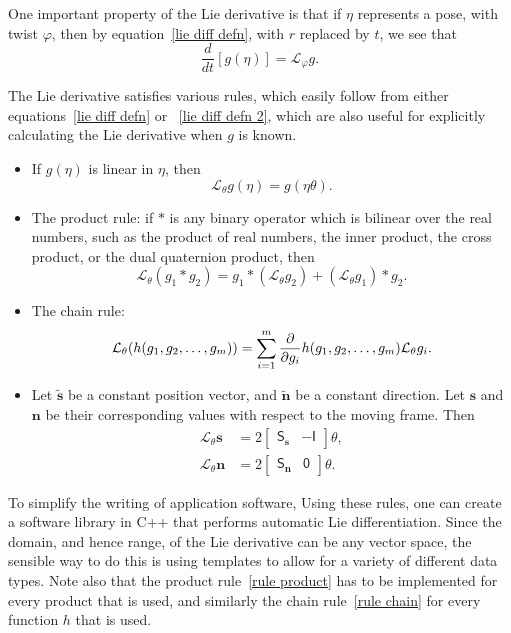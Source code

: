 \documentclass[reqno,12pt]{amsart}
\newcommand\starop[1]{\mathsf S_{#1}}
\newcommand{\liederiv}{\mathcal L}
\begin{document}
One important property of the Lie derivative is that if $\eta$ represents a pose, with twist $\varphi$, then by equation~\eqref{lie diff defn}, with $r$ replaced by $t$, we see that
\begin{equation}
\label{dot f Lie phi}
\frac d{dt} [g(\eta)] = \liederiv_\varphi g .
\end{equation}

The Lie derivative satisfies various rules, which easily follow from either equations~\eqref{lie diff defn} or ~\eqref{lie diff defn 2}, which are also useful for explicitly calculating the Lie derivative when $g$ is known.
\begin{itemize}
\item If $g(\eta)$ is linear in $\eta$, then
\begin{equation}
\label{rule linear}
\liederiv_\theta g(\eta) = g(\eta \theta).
\end{equation}
\item The product rule: if $*$ is any binary operator which is bilinear over the real numbers, such as the product of real numbers, the inner product, the cross product,
or the dual quaternion product, then
\begin{equation}
\label{rule product}
\liederiv_\theta (g_1 * g_2) = g_1 * (\liederiv_\theta g_2) + (\liederiv_\theta g_1) * g_2.
\end{equation}
\item The chain rule:
\begin{equation}
\label{rule chain}
\liederiv_\theta (h(g_1, g_2,\dots,g_m)) \\ = \sum_{i=1}^m
\frac\partial{\partial g_i} h(g_1, g_2,\dots,g_m) \liederiv_\theta g_i .
\end{equation}
\item
Let $\tilde{\bm s}$ be a constant position vector, and $\tilde{\bm n}$ be a constant direction.  Let $\bm s$ and $\bm n$ be their corresponding values with respect to the moving frame.  Then
\begin{align}
\label{lie deriv vector 1}
\mathcal L_\theta \bm s &= 2 \begin{bmatrix} \starop{\bm s} & - \mathsf I \end{bmatrix} \theta , \\
\label{lie deriv vector 2}
\mathcal L_\theta \bm n &= 2 \begin{bmatrix} \starop{\bm n} & \mathsf 0 \end{bmatrix} \theta .
\end{align}
\end{itemize}
To simplify the writing of application software, Using these rules, one can create a software library in C++ that performs automatic Lie differentiation.  Since the domain, and hence range, of the Lie derivative can be any vector space, the sensible way to do this is using templates to allow for a variety of different data types.  Note also that the product rule~\eqref{rule product} has to be implemented for every product that is used, and similarly the chain rule~\eqref{rule chain} for every function $h$ that is used.
\end{document}
